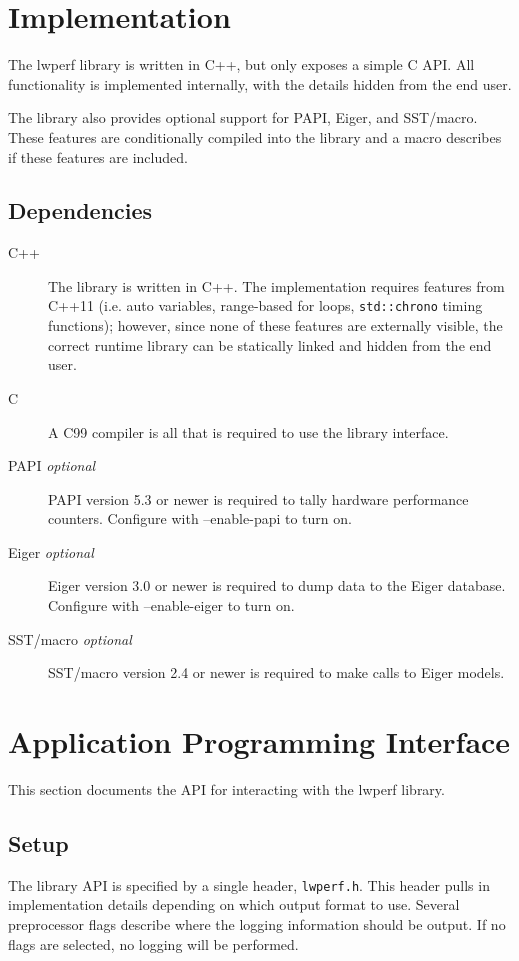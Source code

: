 \documentclass{article}
\begin{document}
\section{Implementation}
\label{sec:impl}
The lwperf library is written in C++, but only exposes a simple C API. All functionality is implemented internally, with the details hidden from the end user.

 The library also provides optional support for PAPI, Eiger, and SST/macro. These features are conditionally compiled into the library and a macro describes if these features are included.

\subsection{Dependencies}
\begin{description}
\item[C++] The library is written in C++. The implementation requires features from C++11 (i.e. auto variables, range-based for loops, \texttt{std::chrono} timing functions); however, since none of these features are externally visible, the correct runtime library can be statically linked and hidden from the end user.
\item [C] A C99 compiler is all that is required to use the library interface. 
\item[PAPI \textit{optional}] PAPI version 5.3 or newer is required to tally hardware performance counters. Configure with --enable-papi to turn on.
\item[Eiger \textit{optional}] Eiger version 3.0 or newer is required to dump data to the Eiger database. Configure with --enable-eiger to turn on.
\item[SST/macro \textit{optional}] SST/macro version 2.4 or newer is required to make calls to Eiger models.
\end{description}

\section{Application Programming Interface}
This section documents the API for interacting with the lwperf library.

\subsection{Setup}
The library API is specified by a single header, \texttt{lwperf.h}. This header pulls in implementation details depending on which output format to use. Several preprocessor flags describe where the logging information should be output. If no flags are selected, no logging will be performed.
\end{document}
